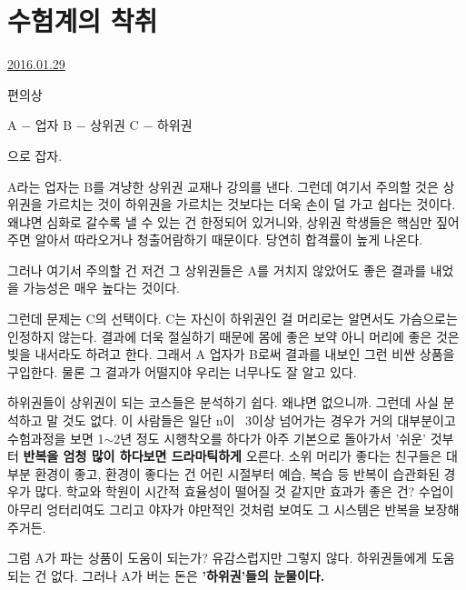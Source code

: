 \section{수험계의 착취}
\href{https://www.kockoc.com/Apoc/615234}{2016.01.29}

\vspace{5mm}

편의상
\vspace{5mm}

A $-$ 업자
B $-$ 상위권
C $-$ 하위권
\vspace{5mm}

으로 잡자.
\vspace{5mm}

A라는 업자는 B를 겨냥한 상위권 교재나 강의를 낸다.
그런데 여기서 주의할 것은 상위권을 가르치는 것이 하위권을 가르치는 것보다는 더욱 손이 덜 가고 쉽다는 것이다.
왜냐면 심화로 갈수록 낼 수 있는 건 한정되어 있거니와, 상위권 학생들은 핵심만 짚어주면 알아서 따라오거나 청출어람하기 때문이다.
당연히 합격률이 높게 나온다.
\vspace{5mm}

그러나 여기서 주의할 건 저건 그 상위권들은 A를 거치지 않았어도 좋은 결과를 내었을 가능성은 매우 높다는 것이다.
\vspace{5mm}

그런데 문제는 C의 선택이다.
C는 자신이 하위권인 걸 머리로는 알면서도 가슴으로는 인정하지 않는다.
결과에 더욱 절실하기 때문에 몸에 좋은 보약 아니 머리에 좋은 것은 빚을 내서라도 하려고 한다.
그래서 A 업자가 B로써 결과를 내보인 그런 비싼 상품을 구입한다.
물론 그 결과가 어떨지야 우리는 너무나도 잘 알고 있다.
\vspace{5mm}

하위권들이 상위권이 되는 코스들은 분석하기 쉽다. 왜냐면 없으니까.
그런데 사실 분석하고 말 것도 없다. 이 사람들은 일단 n이  3이상 넘어가는 경우가 거의 대부분이고
수험과정을 보면 1$\sim$2년 정도 시행착오를 하다가 아주 기본으로 돌아가서 '쉬운' 것부터 \textbf{반복을 엄청 많이 하다보면 드라마틱하게} 오른다.
소위 머리가 좋다는 친구들은 대부분 환경이 좋고, 환경이 좋다는 건 어린 시절부터 예습, 복습 등 반복이 습관화된 경우가 많다.
학교와 학원이 시간적 효율성이 떨어질 것 같지만 효과가 좋은 건?
수업이 아무리 엉터리여도 그리고 야자가 야만적인 것처럼 보여도 그 시스템은 반복을 보장해주거든.
\vspace{5mm}

그럼 A가 파는 상품이 도움이 되는가?
유감스럽지만 그렇지 않다. 하위권들에게 도움되는 건 없다.
그러나 A가 버는 돈은 \textbf{'하위권'들의 눈물이다.}
\vspace{5mm}

